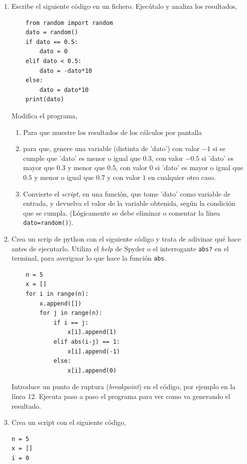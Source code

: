 \begin{enumerate}
\item Escribe el siguiente código en un fichero. Ejecútalo y analiza los resultados,
\begin{verbatim}
	from random import random
	dato = random()
	if dato == 0.5:
		dato = 0
	elif dato < 0.5:
		dato = -dato*10
	else:
		dato = dato*10
	print(dato)
\end{verbatim}

Modifica el programa,
\begin{enumerate}
\item Para que muestre los resultados de los cálculos por pantalla
\item para que, genere una variable (distinta de 'dato') con valor $-1$ si se cumple que 'dato' es menor o igual que $0.3$, con valor $-0.5$ si 'dato' es mayor que $0.3$ y menor que $0.5$, con valor $0$ si 'dato' es mayor o igual que $0.5$ y menor  o igual que $0.7$ y con valor $1$ en cualquier otro caso.
\item Convierte el \emph{script}, en una función, que tome 'dato' como variable de entrada, y devuelva el valor de la variable obtenida, según la condición que se cumpla. (Lógicamente se debe eliminar o comentar la línea \verb|dato=random()|).
\end{enumerate}

\item Crea un scrip de python con el siguiente código y trata de adivinar qué hace antes de ejecutarlo. Utiliza el \emph{help} de Spyder o el interrogante \texttt{abs?} en el terminal, para averiguar lo que hace la función \verb|abs|.
\begin{verbatim}
	n = 5
	x = []
	for i in range(n):
		x.append([])
		for j in range(n):
			if i == j:
				x[i].append(1)
			elif abs(i-j) == 1:
				x[i].append(-1)
			else:
				x[i].append(0)
\end{verbatim}
Introduce un punto de ruptura (\emph{breakpoint}) en el código, por ejemplo en la línea 12. Ejecuta paso a paso el programa para ver como va generando el resultado.

\item Crea un script con el siguiente código,
\begin{verbatim}
n = 5
x = []
i = 0


\end{verbatim}
\end{enumerate}
